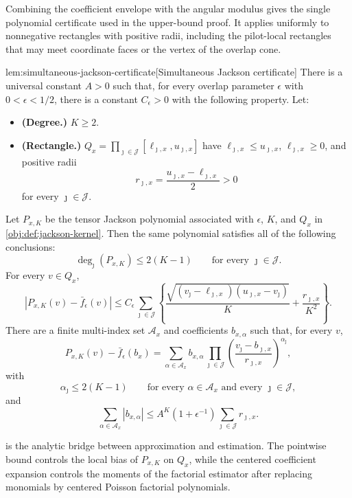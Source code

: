 Combining the coefficient envelope with the angular modulus gives the single polynomial certificate used in the upper-bound proof. It applies uniformly to nonnegative rectangles with positive radii, including the pilot-local rectangles that may meet coordinate faces or the vertex of the overlap cone.

\begin{lemmav}{lem:simultaneous-jackson-certificate}[Simultaneous Jackson certificate]
There is a universal constant \(A>0\) such that, for every overlap parameter \(\epsilon\) with \(0<\epsilon<1/2\), there is a constant \(C_\epsilon>0\) with the following property. Let:
\begin{itemize}
\item \textbf{(Degree.)} \(K\ge 2\).
\item \textbf{(Rectangle.)} \(Q_x=\prod_{\jmath\in\mathcal J}[\ell_{\jmath,x},u_{\jmath,x}]\) have \(\ell_{\jmath,x}\le u_{\jmath,x}\), \(\ell_{\jmath,x}\ge 0\), and positive radii
\[
r_{\jmath,x}=\frac{u_{\jmath,x}-\ell_{\jmath,x}}{2}>0
\]
for every \(\jmath\in\mathcal J\).
\end{itemize}
Let \(P_{x,K}\) be the tensor Jackson polynomial associated with \(\epsilon\), \(K\), and \(Q_x\) in \cref{obj:def:jackson-kernel}. Then the same polynomial satisfies all of the following conclusions:
\[
\deg_{\jmath}(P_{x,K})\le 2(K-1)
\qquad\text{for every }\jmath\in\mathcal J .
\]
For every \(v\in Q_x\),
\[
\left|P_{x,K}(v)-\bar f_\epsilon(v)\right|
\le
C_\epsilon
\sum_{\jmath\in\mathcal J}
\left\{
\frac{\sqrt{(v_{\jmath}-\ell_{\jmath,x})(u_{\jmath,x}-v_{\jmath})}}{K}
+
\frac{r_{\jmath,x}}{K^2}
\right\}.
\]
There are a finite multi-index set \(\mathcal A_x\) and coefficients \(b_{x,\alpha}\) such that, for every \(v\),
\[
P_{x,K}(v)-\bar f_\epsilon(b_x)
=
\sum_{\alpha\in\mathcal A_x}
b_{x,\alpha}
\prod_{\jmath\in\mathcal J}
\left(\frac{v_{\jmath}-b_{\jmath,x}}{r_{\jmath,x}}\right)^{\alpha_{\jmath}},
\]
with
\[
\alpha_{\jmath}\le 2(K-1)
\qquad\text{for every }\alpha\in\mathcal A_x\text{ and every }\jmath\in\mathcal J,
\]
and
\[
\sum_{\alpha\in\mathcal A_x}|b_{x,\alpha}|
\le
A^K(1+\epsilon^{-1})
\sum_{\jmath\in\mathcal J} r_{\jmath,x}.
\]
\end{lemmav}

 is the analytic bridge between approximation and estimation. The pointwise bound controls the local bias of \(P_{x,K}\) on \(Q_x\), while the centered coefficient expansion controls the moments of the factorial estimator after replacing monomials by centered Poisson factorial polynomials.


